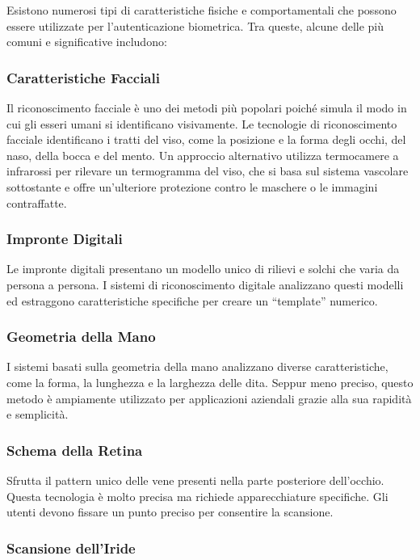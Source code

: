 Esistono numerosi tipi di caratteristiche fisiche e comportamentali che possono essere utilizzate per l'autenticazione biometrica. Tra queste, alcune delle più comuni e significative includono:

\subsubsection{Caratteristiche Facciali}

Il riconoscimento facciale è uno dei metodi più popolari poiché simula il modo in cui gli esseri umani si identificano visivamente. Le tecnologie di riconoscimento facciale identificano i tratti del viso, come la posizione e la forma degli occhi, del naso, della bocca e del mento. Un approccio alternativo utilizza termocamere a infrarossi per rilevare un termogramma del viso, che si basa sul sistema vascolare sottostante e offre un'ulteriore protezione contro le maschere o le immagini contraffatte.

\subsubsection{Impronte Digitali}

Le impronte digitali presentano un modello unico di rilievi e solchi che varia da persona a persona. I sistemi di riconoscimento digitale analizzano questi modelli ed estraggono caratteristiche specifiche per creare un ``template'' numerico.

\subsubsection{Geometria della Mano}

I sistemi basati sulla geometria della mano analizzano diverse caratteristiche, come la forma, la lunghezza e la larghezza delle dita. Seppur meno preciso, questo metodo è ampiamente utilizzato per applicazioni aziendali grazie alla sua rapidità e semplicità.

\subsubsection{Schema della Retina}

Sfrutta il pattern unico delle vene presenti nella parte posteriore dell'occhio. Questa tecnologia è molto precisa ma richiede apparecchiature specifiche. Gli utenti devono fissare un punto preciso per consentire la scansione.

\subsubsection{Scansione dell'Iride}

